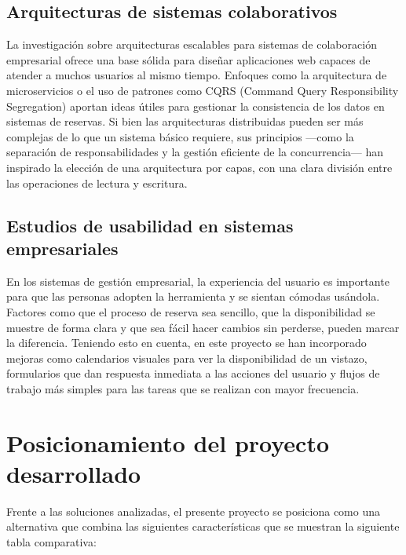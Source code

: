 \subsection{Arquitecturas de sistemas colaborativos}\label{arquitecturas-sistemas-colaborativos}
La investigación sobre arquitecturas escalables para sistemas de colaboración empresarial ofrece una base sólida para diseñar aplicaciones web capaces de atender a muchos usuarios al mismo tiempo. Enfoques como la arquitectura de microservicios o el uso de patrones como CQRS (Command Query Responsibility Segregation) aportan ideas útiles para gestionar la consistencia de los datos en sistemas de reservas.
Si bien las arquitecturas distribuidas pueden ser más complejas de lo que un sistema básico requiere, sus principios —como la separación de responsabilidades y la gestión eficiente de la concurrencia— han inspirado la elección de una arquitectura por capas, con una clara división entre las operaciones de lectura y escritura.

\subsection{Estudios de usabilidad en sistemas empresariales}\label{estudios-usuabilidad-sistemas-empresariales}
En los sistemas de gestión empresarial, la experiencia del usuario es importante para que las personas adopten la herramienta y se sientan cómodas usándola. Factores como que el proceso de reserva sea sencillo, que la disponibilidad se muestre de forma clara y que sea fácil hacer cambios sin perderse, pueden marcar la diferencia.
Teniendo esto en cuenta, en este proyecto se han incorporado mejoras como calendarios visuales para ver la disponibilidad de un vistazo, formularios que dan respuesta inmediata a las acciones del usuario y flujos de trabajo más simples para las tareas que se realizan con mayor frecuencia.

\newpage

\section{Posicionamiento del proyecto desarrollado}\label{posicionamiento-proyecto-desarrollado}
Frente a las soluciones analizadas, el presente proyecto se posiciona como una alternativa que combina las siguientes características que se muestran la siguiente tabla comparativa:

